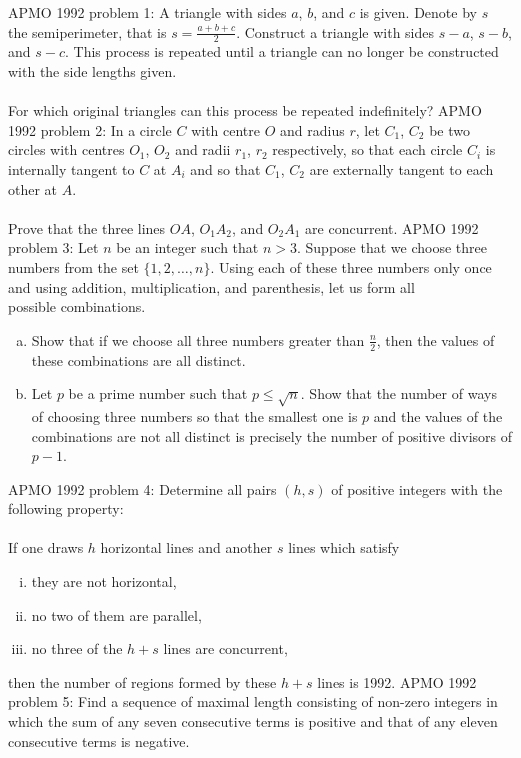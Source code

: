 APMO 1992 problem 1:  A triangle with sides $a$, $b$, and $c$ is given.  Denote by $s$ the semiperimeter, that is $s = \frac{a + b + c}{2}$.  Construct a triangle with sides $s - a$, $s - b$, and $s - c$.  This process is repeated until a triangle can no longer be constructed with the side lengths given. \\\\
For which original triangles can this process be repeated indefinitely? 
APMO 1992 problem 2:  In a circle $C$ with centre $O$ and radius $r$, let $C_1$, $C_2$ be two circles with centres $O_1$, $O_2$ and radii $r_1$, $r_2$ respectively, so that each circle $C_i$ is internally tangent to $C$ at $A_i$ and so that $C_1$, $C_2$ are externally tangent to each other at $A$. \\\\
Prove that the three lines $OA$, $O_1 A_2$, and $O_2 A_1$ are concurrent. 
APMO 1992 problem 3:  Let $n$ be an integer such that $n > 3$.  Suppose that we choose three numbers from the set $\{1, 2, \ldots, n\}$.  Using each of these three numbers only once and using addition, multiplication, and parenthesis, let us form all \\
possible combinations.
\begin{enumerate}[(a)]
  \item Show that if we choose all three numbers greater than $\frac{n}{2}$, then the values of these combinations are all distinct.
  \item Let $p$ be a prime number such that $p \leq \sqrt{n}$.  Show that the number of ways of choosing three numbers so that the smallest one is $p$ and the values of the combinations are not all distinct is precisely the number of positive divisors of $p - 1$.
\end{enumerate} 
APMO 1992 problem 4:  Determine all pairs $(h,s)$ of positive integers with the following property: \\\\
If one draws $h$ horizontal lines and another $s$ lines which satisfy
\begin{enumerate}[(i)]
  \item they are not horizontal,
  \item no two of them are parallel,
  \item no three of the $h + s$ lines are concurrent,
\end{enumerate}
then the number of regions formed by these $h + s$ lines is 1992. 
APMO 1992 problem 5:  Find a sequence of maximal length consisting of non-zero integers in which the sum of any seven consecutive terms is positive and that of any eleven consecutive terms is negative. 


